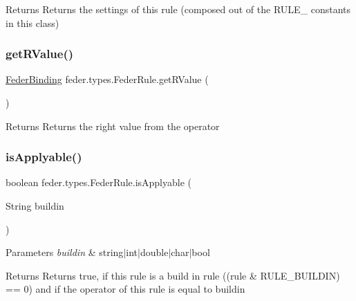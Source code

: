 \begin{DoxyReturn}{Returns}
Returns the settings of this rule (composed out of the R\+U\+L\+E\+\_\+ constants in this class) 
\end{DoxyReturn}
\mbox{\label{classfeder_1_1types_1_1FederRule_a306bb79d403d4de804ece5ae47c0d524}} 
\subsubsection{\texorpdfstring{get\+R\+Value()}{getRValue()}}
{\footnotesize\ttfamily \hyperlink{classfeder_1_1types_1_1FederBinding}{Feder\+Binding} feder.\+types.\+Feder\+Rule.\+get\+R\+Value (\begin{DoxyParamCaption}{ }\end{DoxyParamCaption})}

\begin{DoxyReturn}{Returns}
Returns the right value from the operator 
\end{DoxyReturn}
\mbox{\label{classfeder_1_1types_1_1FederRule_afcc217a0afa07a0a6eb6a3bbe3cfb70a}} 
\subsubsection{\texorpdfstring{is\+Applyable()}{isApplyable()}\hspace{0.1cm}{\footnotesize\ttfamily [1/2]}}
{\footnotesize\ttfamily boolean feder.\+types.\+Feder\+Rule.\+is\+Applyable (\begin{DoxyParamCaption}\item[{String}]{buildin }\end{DoxyParamCaption})}


\begin{DoxyParams}{Parameters}
{\em buildin} & string$\vert$int$\vert$double$\vert$char$\vert$bool \\
\hline
\end{DoxyParams}
\begin{DoxyReturn}{Returns}
Returns true, if this rule is a build in rule ((rule \& R\+U\+L\+E\+\_\+\+B\+U\+I\+L\+D\+IN) == 0) and if the operator of this rule is equal to buildin 
\end{DoxyReturn}
\mbox{\label{classfeder_1_1types_1_1FederRule_a90ca7877e026698624a675f72783e7d2}} 
